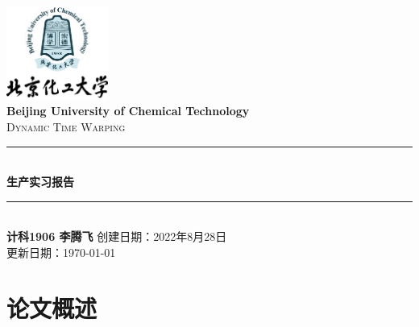 \documentclass[cs4size,a4paper]{ctexart}
\numberwithin{equation}{section}
\numberwithin{table}{section}
\numberwithin{figure}{section}
\newcommand{\HRule}{\rule{\linewidth}{0.5mm}}
\begin{document}
\newtheorem{example}{例}              	%
\newtheorem{algorithem}{算法}	
\newtheorem{theorem}{定理}            	%
\newtheorem{definition}{定义}
\newtheorem{axiom}{公理}
\newtheorem{property}{性质}
\newtheorem{proposition}{命题}
\newtheorem{lemma}{引理}
\newtheorem{corollary}{推论}
\newtheorem{remark}{注解}
\newtheorem{condition}{条件}
\newtheorem{conclusion}{结论}
\newtheorem{assumption}{假设}
\renewcommand{\contentsname}{目录}     
\renewcommand{\abstractname}{摘要} 
\renewcommand{\refname}{参考文献}     
\renewcommand{\indexname}{索引}
\renewcommand{\figurename}{图}
\renewcommand{\tablename}{表}
\renewcommand{\appendixname}{附录}
\renewcommand{\proofname}{证明}
\renewcommand\emph[1]{\textcolor{red}{\textbf{#1}}}
\begin{titlepage}
\begin{center}
\includegraphics[width=0.25\textwidth]{logo}\\[1cm]    
\textsf{\Large\bfseries Beijing University of Chemical Technology}\\[1.0cm]
\textsc{\Large Dynamic Time Warping}\\[0.5cm]
\HRule \\[0.8cm]
{\huge \bfseries 生产实习报告}\\[0.4cm]
\HRule \\[0.7cm]
\textsf{\bfseries 计科1906 李腾飞}
\tableofcontents 
\vfill
{创建日期：2022年8月28日}\\
{更新日期：\today}
\end{center}
\end{titlepage}
\pagestyle{plain}
\thispagestyle{empty}
\pagestyle{fancy}



\section{论文概述}
\end{document}
